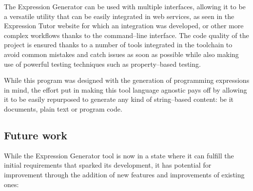 \documentclass[]{usiinfbachelorproject}
\begin{document}
The Expression Generator can be used with multiple interfaces, allowing it to
be a versatile utility that can be easily integrated in web services,
as seen in the Expression Tutor website for which an integration was developed,
or other more complex workflows thanks to the command–line interface.
The code quality of the project is ensured thanks to a number of tools
integrated in the toolchain to avoid common mistakes and catch issues as soon
as possible while also making use of powerful testing techniques such as
property–based testing.

While this program was designed with the generation of programming expressions
in mind, the effort put in making this tool language agnostic pays off by
allowing it to be easily repurposed to generate any kind of string–based
content: be it documents, plain text or program code.

\subsection*{Future work}

While the Expression Generator tool is now in a state where it can fulfill the
initial requirements that sparked its development, it has potential for
improvement through the addition of new features and improvements of existing
ones:
\end{document}
